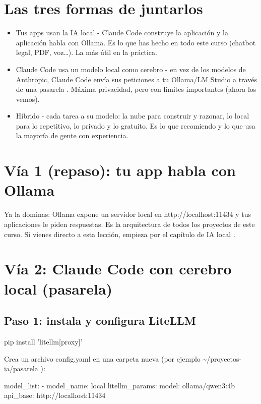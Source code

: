 \documentclass[11pt,a4paper]{book}
\begin{document}
\section{Las tres formas de juntarlos}
\begin{itemize}\item Tus apps usan la IA local - Claude Code construye la aplicación y la aplicación habla con Ollama. Es lo que has hecho en todo este curso (chatbot legal, PDF, voz…). La más útil en la práctica.\end{itemize}
\begin{itemize}\item Claude Code usa un modelo local como cerebro - en vez de los modelos de Anthropic, Claude Code envía sus peticiones a tu Ollama/LM Studio a través de una pasarela . Máxima privacidad, pero con límites importantes (ahora los vemos).\end{itemize}
\begin{itemize}\item Híbrido - cada tarea a su modelo: la nube para construir y razonar, lo local para lo repetitivo, lo privado y lo gratuito. Es lo que recomiendo y lo que usa la mayoría de gente con experiencia.\end{itemize}
\section{Vía 1 (repaso): tu app habla con Ollama}
Ya la dominas: Ollama expone un servidor local en http://localhost:11434 y tus aplicaciones le piden respuestas. Es la arquitectura de todos los proyectos de este curso. Si vienes directo a esta lección, empieza por el capítulo de IA local .

\section{Vía 2: Claude Code con cerebro local (pasarela)}
\subsection{Paso 1: instala y configura LiteLLM}
\begin{codebox}
pip install 'litellm[proxy]'
\end{codebox}
Crea un archivo config.yaml en una carpeta nueva (por ejemplo \textasciitilde{}/proyectos-ia/pasarela ):

\begin{codebox}
model_list:
  - model_name: local
    litellm_params:
      model: ollama/qwen3:4b
      api_base: http://localhost:11434
\end{codebox}
\end{document}
